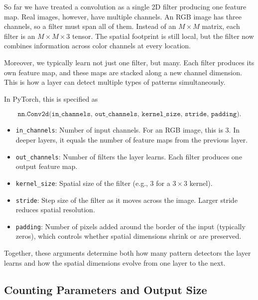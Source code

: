 \medskip

So far we have treated a convolution as a single 2D filter producing one feature map. Real images, however, have multiple channels. An RGB image has three channels, so a filter must span all of them. Instead of an $M \times M$ matrix, each filter is an $M \times M \times 3$ tensor. The spatial footprint is still local, but the filter now combines information across color channels at every location.

Moreover, we typically learn not just one filter, but many. Each filter produces its own feature map, and these maps are stacked along a new channel dimension. This is how a layer can detect multiple types of patterns simultaneously.

\medskip

In PyTorch, this is specified as

\[
\texttt{nn.Conv2d(in\_channels, out\_channels, kernel\_size, stride, padding)}.
\]

\begin{itemize}[itemsep=0.3em]
\item \texttt{in\_channels}: Number of input channels. For an RGB image, this is 3. In deeper layers, it equals the number of feature maps from the previous layer.

\item \texttt{out\_channels}: Number of filters the layer learns. Each filter produces one output feature map.

\item \texttt{kernel\_size}: Spatial size of the filter (e.g., $3$ for a $3 \times 3$ kernel).

\item \texttt{stride}: Step size of the filter as it moves across the image. Larger stride reduces spatial resolution.

\item \texttt{padding}: Number of pixels added around the border of the input (typically zeros), which controls whether spatial dimensions shrink or are preserved.
\end{itemize}

Together, these arguments determine both how many pattern detectors the layer learns and how the spatial dimensions evolve from one layer to the next.

\subsection{Counting Parameters and Output Size}

